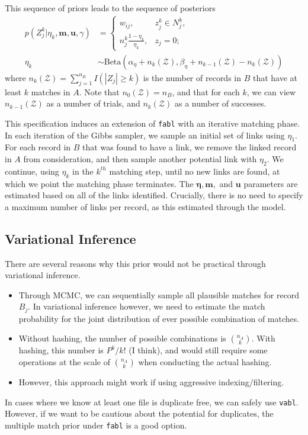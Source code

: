 \documentclass[12pt,letterpaper]{article}
\newcommand{\1}[1]{\mathbb{I}\!\left[#1\right]} %
\begin{document}
This sequence of priors leads to the sequence of posteriors
\begin{align}
	p(Z_j^k|\eta_k, \bm{m}, \bm{u}, \gamma) &= \begin{cases}
		w_{ij}, & z_j^k \in N_j^k, \\
		n_j^k \frac{1 - \eta_k}{\eta_k}, & z_j = 0;
	\end{cases} \\
	\eta_k &\sim \text{Beta}(\alpha_{\eta} + n_k(\mathcal{Z}), \beta_{\eta} + n_{k-1}(\mathcal{Z}) - n_k(\mathcal{Z}))
\end{align}
where $n_k(\mathcal{Z}) = \sum_{j=1}^{n_B} I( |Z_j| \geq k)$ is the number of records in $B$ that have at least $k$ matches in $A$. Note that $n_0(\mathcal{Z}) = n_B$, and that for each $k$, we can view $n_{k-1}{(\mathcal{Z})}$ as a number of trials, and $n_{k}{(\mathcal{Z})}$ as a number of successes. 

This specification induces an extension of \texttt{fabl} with an iterative matching phase. In each iteration of the Gibbs sampler, we sample an initial set of links using $\eta_1$. For each record in $B$ that was found to have a link, we remove the linked record in $A$ from consideration, and then sample another potential link with $\eta_2$. We continue, using $\eta_k$ in the $k^{th}$ matching step, until no new links are found, at which we point the matching phase terminates. The $\bm{\eta}, \bm{m},$ and $\bm{u}$ parameters are estimated based on all of the links identified. Crucially, there is no need to specify a maximum number of links per record, as this estimated through the model.

\subsection{Variational Inference}
There are several reasons why this prior would not be practical through variational inference.
\begin{itemize}
	\item Through MCMC, we can sequentially sample all plausible matches for record $B_j$. In variational inference however, we need to estimate the match probability for the joint distribution of ever possible combination of matches. 
	\item Without hashing, the number of possible combinations is $n_A \choose k$. With hashing, this number is $P^k / k!$ (I think), and would still require some operations at the scale of $n_A \choose k$ when conducting the actual hashing.
	\item However, this approach might work if using aggressive indexing/filtering.  
\end{itemize}
In cases where we know at least one file is duplicate free, we can safely use \texttt{vabl}. However, if we want to be cautious about the potential for duplicates, the multiple match prior under \texttt{fabl} is a good option. 
\end{document}
